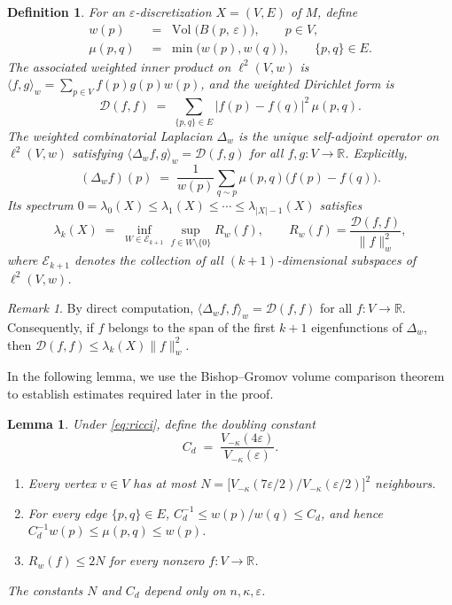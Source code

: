 \documentclass[10pt,reqno]{amsart}
\newtheorem{lemma}[theorem]{Lemma}
\newtheorem{definition}[theorem]{Definition}
\theoremstyle{remark}
\newtheorem{remark}[theorem]{Remark}
\newcommand{\R}{\mathbb{R}}
\newcommand{\Vol}{\operatorname{Vol}}
\newcommand{\normw}[1]{\lVert #1 \rVert_{w}}
\newcommand{\DD}{\mathcal{D}}
\newcommand{\Rw}{R_{w}}
\newcommand{\Vk}{V_{-\kappa}}
\newcommand{\B}[2]{B(#1,\,#2)}
\begin{document}
\begin{definition}
\label{def:weights}
For an $\varepsilon$-discretization $X=(V,E)$ of $M$, define
\begin{align*}
  w(p) &\;=\; \Vol\bigl(\B{p}{\varepsilon}\bigr),
  \qquad p\in V,\\
  \mu(p,q) &\;=\; \min\bigl(w(p),w(q)\bigr),
  \qquad \{p,q\}\in E.
\end{align*}
The associated \emph{weighted inner product} on $\ell^2(V,w)$ is
$\langle f,g\rangle_w = \sum_{p\in V}f(p)g(p)w(p)$,
and the \emph{weighted Dirichlet form} is
\[
  \DD(f,f)
  \;=\;
  \sum_{\{p,q\}\in E}|f(p)-f(q)|^2\,\mu(p,q).
\]
The \emph{weighted combinatorial Laplacian} $\Delta_w$ is the unique
self-adjoint operator on $\ell^2(V,w)$ satisfying
$\langle\Delta_w f,g\rangle_w = \DD(f,g)$ for all $f,g:V\to\R$.
Explicitly,
\[
  (\Delta_w f)(p)
  \;=\;
  \frac{1}{w(p)}\sum_{q\sim p}\mu(p,q)\bigl(f(p)-f(q)\bigr).
\]
Its spectrum $0=\lambda_0(X)\leq\lambda_1(X)\leq\cdots\leq\lambda_{|X|-1}(X)$
satisfies
\[
  \lambda_k(X)
  \;=\;
  \inf_{W\in\mathcal{E}_{k+1}}
  \sup_{f\in W\setminus\{0\}}\Rw(f),
  \qquad
  \Rw(f)=\frac{\DD(f,f)}{\normw{f}^2},
\]
where $\mathcal{E}_{k+1}$ denotes the collection of all $(k+1)$-dimensional
subspaces of $\ell^2(V,w)$.
\end{definition}

\begin{remark}
\label{rem:quadform}
By direct computation, $\langle\Delta_w f,f\rangle_w = \DD(f,f)$ for all
$f:V\to\R$. Consequently, if $f$ belongs to the span of the first $k+1$
eigenfunctions of $\Delta_w$, then
$\DD(f,f)\leq\lambda_k(X)\normw{f}^2$.
\end{remark}


In the following lemma, we use the Bishop--Gromov volume comparison theorem to establish estimates required later in the proof.  

\begin{lemma}
\label{lem:BG}
Under \eqref{eq:ricci}, define the \emph{doubling constant}
\[
  C_d \;=\; \frac{\Vk(4\varepsilon)}{\Vk(\varepsilon)}.
\]
\begin{enumerate}[label=(\roman*)]
\item\label{it:degree}
Every vertex $v\in V$ has at most
$N = \bigl[\Vk(7\varepsilon/2)/\Vk(\varepsilon/2)\bigr]^2$
neighbours.
\item\label{it:comp}
For every edge $\{p,q\}\in E$,
$C_d^{-1}\leq w(p)/w(q)\leq C_d$,
and hence $C_d^{-1}w(p)\leq\mu(p,q)\leq w(p)$.
\item\label{it:Rw}
$\Rw(f)\leq 2N$ for every nonzero $f:V\to\R$.
\end{enumerate}
The constants $N$ and $C_d$ depend only on $n,\kappa,\varepsilon$.
\end{lemma}
\end{document}
